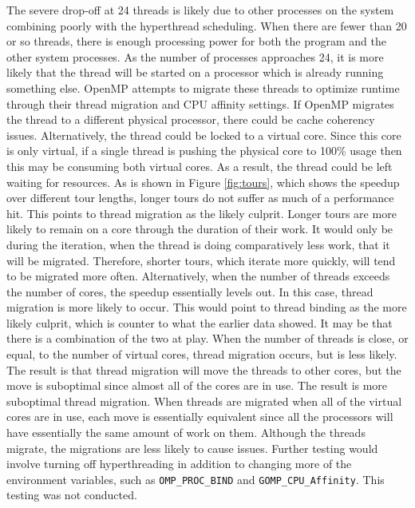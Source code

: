 \documentclass[10pt,letterpaper]{article}
\begin{document}
The severe drop-off at 24 threads is likely due to other processes on the system combining poorly with the hyperthread scheduling. When there are fewer than 20 or so threads, there is enough processing power for both the program and the other system processes. As the number of processes approaches 24, it is more likely that the thread will be started on a processor which is already running something else. OpenMP attempts to migrate these threads to optimize runtime through their thread migration and CPU affinity settings. If OpenMP migrates the thread to a different physical processor, there could be cache coherency issues. Alternatively, the thread could be locked to a virtual core. Since this core is only virtual, if a single thread is pushing the physical core to 100\% usage then this may be consuming both virtual cores. As a result, the thread could be left waiting for resources. As is shown in Figure \ref{fig:tours}, which shows the speedup over different tour lengths, longer tours do not suffer as much of a performance hit. This points to thread migration as the likely culprit. Longer tours are more likely to remain on a core through the duration of their work. It would only be during the iteration, when the thread is doing comparatively less work, that it will be migrated. Therefore, shorter tours, which iterate more quickly, will tend to be migrated more often. Alternatively, when the number of threads exceeds the number of cores, the speedup essentially levels out. In this case, thread migration is more likely to occur. This would point to thread binding as the more likely culprit, which is counter to what the earlier data showed. It may be that there is a combination of the two at play. When the number of threads is close, or equal, to the number of virtual cores, thread migration occurs, but is less likely. The result is that thread migration will move the threads to other cores, but the move is suboptimal since almost all of the cores are in use. The result is more suboptimal thread migration. When threads are migrated when all of the virtual cores are in use, each move is essentially equivalent since all the processors will have essentially the same amount of work on them. Although the threads migrate, the migrations are less likely to cause issues. Further testing would involve turning off hyperthreading in addition to changing more of the environment variables, such as \texttt{OMP\_PROC\_BIND} and \texttt{GOMP\_CPU\_Affinity}. This testing was not conducted.
\end{document}
